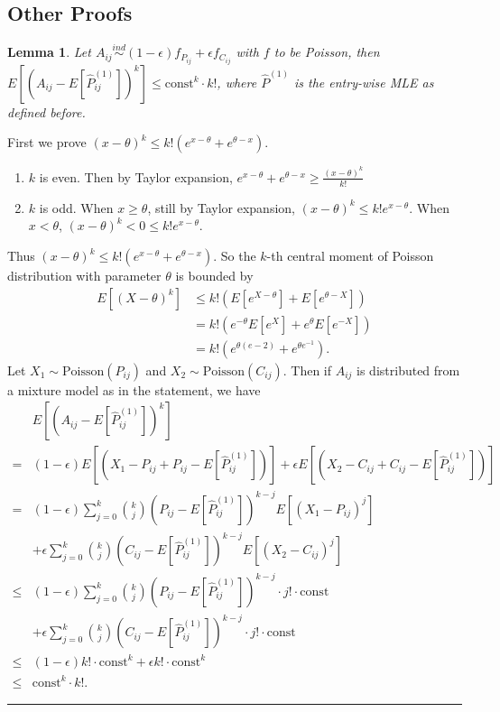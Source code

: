 \documentclass[a4paper]{article}
\newenvironment{proof}{{\bf Proof:  }}{\hfill\rule{2mm}{2mm}}
\newtheorem{lemma}[fact]{Lemma}
\renewcommand{\hat}{\widehat}
\begin{document}
\subsection{Other Proofs}
\label{section:pf_other}

\begin{lemma}
\label{lm:poisson}
Let $A_{ij} \stackrel{ind}{\sim} (1-\epsilon) f_{P_{ij}} + \epsilon f_{C_{ij}}$ with $f$ to be Poisson, then $E[(A_{ij} - E[\hat{P}_{ij}^{(1)}])^k] \le \mathrm{const}^k \cdot k!$, where $\hat{P}^{(1)}$ is the entry-wise MLE as defined before.
\end{lemma}
\begin{proof}
First we prove $(x - \theta)^k \le k! (e^{x-\theta} + e^{\theta - x})$.
\begin{enumerate}
\item $k$ is even. Then by Taylor expansion, $e^{x - \theta} + e^{\theta - x} \ge \frac{(x-\theta)^k}{k!}$
\item $k$ is odd. When $x \ge \theta$, still by Taylor expansion, $(x-\theta)^k \le k! e^{x-\theta}$. When $x < \theta$, $(x-\theta)^k < 0 \le k! e^{x-\theta}$.
\end{enumerate}
Thus $(x - \theta)^k \le k! (e^{x-\theta} + e^{\theta - x})$.
So the $k$-th central moment of Poisson distribution with parameter $\theta$ is bounded by
\begin{align*}
E[(X-\theta)^k] & \le k! \left( E[e^{X-\theta}] + E[e^{\theta - X}] \right) \\
& = k! \left( e^{-\theta} E[e^X] + e^{\theta} E[e^{-X}] \right) \\
& = k! \left( e^{\theta(e - 2)} + e^{\theta e^{-1}} \right).
\end{align*}
Let $X_1 \sim \mathrm{Poisson}(P_{ij})$ and $X_2 \sim \mathrm{Poisson}(C_{ij})$.
Then if $A_{ij}$ is distributed from a mixture model as in the statement, we have
\begin{align*}
& E[(A_{ij} - E[\hat{P}_{ij}^{(1)}])^k] \\
= & (1-\epsilon) E[(X_1 - P_{ij} + P_{ij} - E[\hat{P}_{ij}^{(1)}])] +
\epsilon E[(X_2 - C_{ij} + C_{ij} - E[\hat{P}_{ij}^{(1)}])] \\
= & (1-\epsilon) \sum_{j = 0}^k \binom{k}{j} (P_{ij} - E[\hat{P}_{ij}^{(1)}])^{k - j} E[(X_1 - P_{ij})^j] \\
& + \epsilon \sum_{j = 0}^k \binom{k}{j} (C_{ij} - E[\hat{P}_{ij}^{(1)}])^{k - j} E[(X_2 - C_{ij})^j] \\
\le & (1-\epsilon) \sum_{j = 0}^k \binom{k}{j} (P_{ij} - E[\hat{P}_{ij}^{(1)}])^{k - j} \cdot j! \cdot \mathrm{const} \\
& + \epsilon \sum_{j = 0}^k \binom{k}{j} (C_{ij} - E[\hat{P}_{ij}^{(1)}])^{k - j} \cdot j! \cdot \mathrm{const} \\ 
\le & (1-\epsilon) k! \cdot \mathrm{const}^k + \epsilon k! \cdot \mathrm{const}^k \\
\le & \mathrm{const}^k \cdot k!.
\end{align*}
\end{proof}
\end{document}
